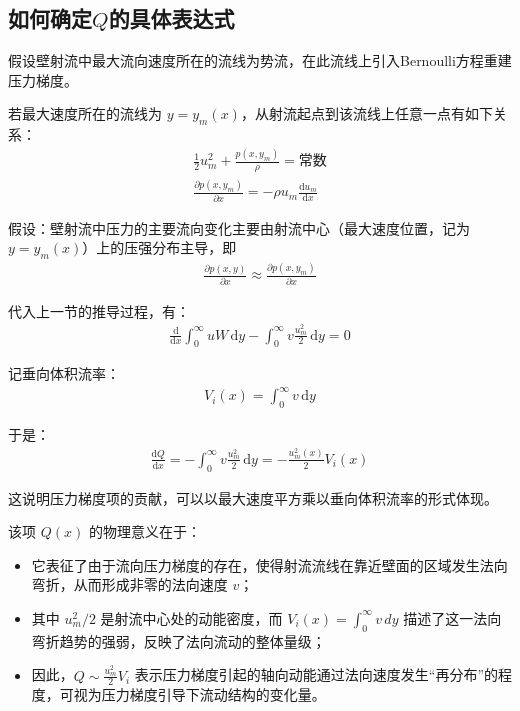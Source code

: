 \subsection{如何确定\(Q\)的具体表达式}

假设壁射流中最大流向速度所在的流线为势流，在此流线上引入Bernoulli方程重建压力梯度。

若最大速度所在的流线为 \(y = y_m(x)\)，从射流起点到该流线上任意一点有如下关系：
\begin{align}
    \frac{1}{2}u_m^2 + \frac{p(x, y_m)}{\rho} = \text{常数} \\
    \frac{\partial p(x, y_m)}{\partial x} = -\rho u_m \frac{\mathrm{d} u_m}{\mathrm{d} x}
\end{align}

假设：壁射流中压力的主要流向变化主要由射流中心（最大速度位置，记为 \(y = y_m(x)\)）上的压强分布主导，即
\begin{align}
    \frac{\partial p(x, y)}{\partial x} \approx \frac{\partial p(x, y_m)}{\partial x}
\end{align}

代入上一节的推导过程，有：
\begin{align}
    \frac{\mathrm{d}}{\mathrm{d}x} \int_0^\infty uW\,\mathrm{d}y - \int_0^\infty v\frac{u_m^2}{2}\,\mathrm{d}y = 0
\end{align}

记垂向体积流率：
\begin{align}
    V_i(x) = \int_0^\infty v\,\mathrm{d}y
\end{align}

于是：
\begin{align}
    \frac{\mathrm{d}Q}{\mathrm{d}x} = -\int_0^\infty v\frac{u_m^2}{2}\,\mathrm{d}y = -\frac{u_m^2(x)}{2} V_i(x)
\end{align}

这说明压力梯度项的贡献，可以以最大速度平方乘以垂向体积流率的形式体现。

该项 \( Q(x) \) 的物理意义在于：

\begin{itemize}
    \item 它表征了由于流向压力梯度的存在，使得射流流线在靠近壁面的区域发生法向弯折，从而形成非零的法向速度 \( v \)；
    \item 其中 \( u_m^2/2 \) 是射流中心处的动能密度，而 \( V_i(x) = \int_0^\infty v\,dy \) 描述了这一法向弯折趋势的强弱，反映了法向流动的整体量级；
    \item 因此，\( Q \sim \frac{u_m^2}{2} V_i \) 表示压力梯度引起的轴向动能通过法向速度发生“再分布”的程度，可视为压力梯度引导下流动结构的变化量。
\end{itemize}

